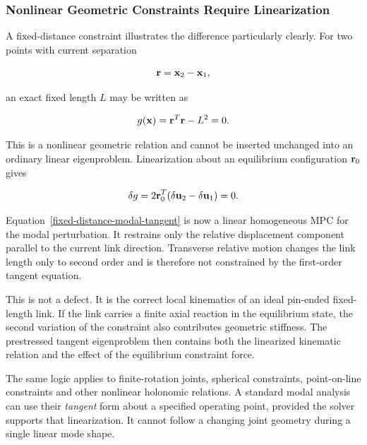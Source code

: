 \subsubsection{Nonlinear Geometric Constraints Require Linearization}

A fixed-distance constraint illustrates the difference particularly clearly.
For two points with current separation

\begin{equation}
    \mathbf{r}=\mathbf{x}_2-\mathbf{x}_1,
\end{equation}

an exact fixed length $L$ may be written as

\begin{equation}\label{fixed-distance-modal-nonlinear}
    g(\mathbf{x})
    =\mathbf{r}^{T}\mathbf{r}-L^2=0.
\end{equation}

This is a nonlinear geometric relation and cannot be inserted unchanged into an
ordinary linear eigenproblem. Linearization about an equilibrium configuration
$\mathbf{r}_0$ gives

\begin{equation}\label{fixed-distance-modal-tangent}
    \delta g
    =2\mathbf{r}_0^{T}
    (\delta\mathbf{u}_2-\delta\mathbf{u}_1)=0.
\end{equation}

Equation~\eqref{fixed-distance-modal-tangent} is now a linear homogeneous MPC for
the modal perturbation. It restrains only the relative displacement component
parallel to the current link direction. Transverse relative motion changes the
link length only to second order and is therefore not constrained by the
first-order tangent equation.

This is not a defect. It is the correct local kinematics of an ideal pin-ended
fixed-length link. If the link carries a finite axial reaction in the equilibrium
state, the second variation of the constraint also contributes geometric
stiffness. The prestressed tangent eigenproblem then contains both the linearized
kinematic relation and the effect of the equilibrium constraint force.

The same logic applies to finite-rotation joints, spherical constraints,
point-on-line constraints and other nonlinear holonomic relations. A standard
modal analysis can use their \emph{tangent} form about a specified operating
point, provided the solver supports that linearization. It cannot follow a
changing joint geometry during a single linear mode shape.

